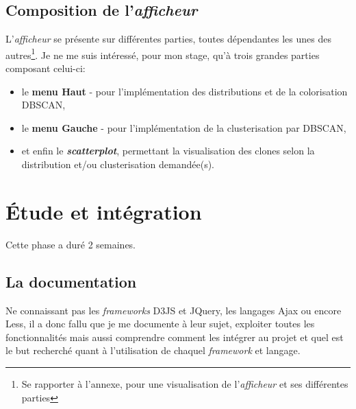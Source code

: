 \documentclass[12pt]{report}
\begin{document}
\begin{spacing}{1.2}
\subsection{Composition de l'\textit{afficheur}}

L'\textit{afficheur} se présente sur différentes parties, toutes dépendantes les unes des autres\footnote{Se rapporter à l'annexe, pour une visualisation de l'\textit{afficheur} et ses différentes parties}.
\newline Je ne me suis intéressé, pour mon stage, qu'à trois grandes parties composant celui-ci:
\begin{itemize}
\item{le \textbf{menu Haut} - pour l'implémentation des distributions et de la colorisation DBSCAN,}
\item{le \textbf{menu Gauche} - pour l'implémentation de la clusterisation par DBSCAN,}
\item{et enfin le \textbf{\textit{scatterplot}}, permettant la visualisation des clones selon la distribution et/ou clusterisation demandée(s).}
\end{itemize}

\section{Étude et intégration}

Cette phase a duré 2 semaines.

\subsection{La documentation}
Ne connaissant pas les \textit{frameworks} D3JS et JQuery, les langages Ajax ou encore Less, il a donc fallu que je me documente à leur sujet, exploiter toutes les fonctionnalités mais aussi comprendre comment les intégrer au projet et quel est le but recherché quant à l'utilisation de chaquel \textit{framework} et langage.


\end{spacing}
\end{document}
